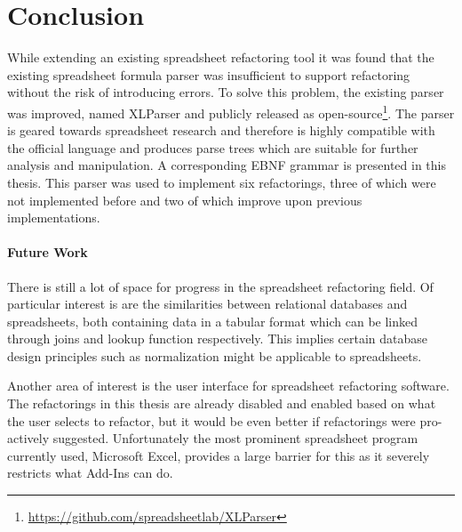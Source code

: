 
\chapter{Conclusion}

While extending an existing spreadsheet refactoring tool it was found that the existing spreadsheet formula parser was insufficient to support refactoring without the risk of introducing errors.
To solve this problem, the existing parser was improved, named XLParser and publicly released as open-source\footnote{\url{https://github.com/spreadsheetlab/XLParser}}.
The parser is geared towards spreadsheet research and therefore is highly compatible with the official language and produces parse trees which are suitable for further analysis and manipulation.
A corresponding EBNF grammar is presented in this thesis.
This parser was used to implement six refactorings, three of which were not implemented before and two of which improve upon previous implementations.

\subsubsection{Future Work}

There is still a lot of space for progress in the spreadsheet refactoring field.
Of particular interest is are the similarities between relational databases and spreadsheets, both containing data in a tabular format which can be linked through joins and lookup function respectively.
This implies certain database design principles such as normalization might be applicable to spreadsheets.

Another area of interest is the user interface for spreadsheet refactoring software.
The refactorings in this thesis are already disabled and enabled based on what the user selects to refactor, but it would be even better if refactorings were pro-actively suggested. 
Unfortunately the most prominent spreadsheet program currently used, Microsoft Excel, provides a large barrier for this as it severely restricts what Add-Ins can do.